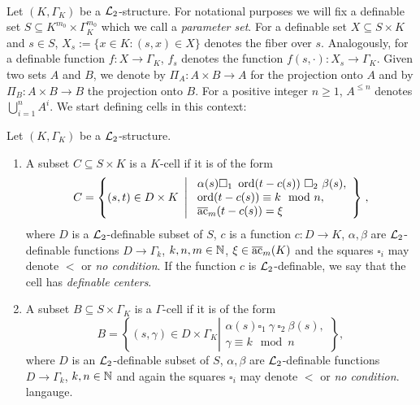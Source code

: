 \

Let $(K,\Gamma_K)$ be a ${\mathcal L}_2$-structure. For notational purposes we will fix a definable set $S \subseteq K^{m_0} \times \Gamma_K^{m_0}$ which we call a \emph{parameter set}. For a definable set $X\subseteq S\times K$ and $s\in S$, $X_s:=\{x\in K: (s,x)\in X\}$ denotes the fiber over $s$. Analogously, for a definable function $f:X\rightarrow \Gamma_K$, $f_s$ denotes the function $f(s,\cdot):X_s\rightarrow \Gamma_K$. Given two sets $A$ and $B$, we denote by $\Pi_{A}:A\times B\to A$ for the projection onto $A$ and by $\Pi_B:A\times B\to B$ the projection onto $B$. For a positive integer $n\geq 1$, $A^{\leq n}$ denotes $\bigcup_{i=1}^n A^i$. We start defining cells in this context: 


\begin{defn}[Cells] Let $(K,\Gamma_K)$ be a ${\mathcal L}_2$-structure.  
\begin{enumerate}
\item A subset $C\subseteq S\times K$ is a $K$-cell if it is of the form 
\[C = \left\{(s,t) \in D\times K \ \left| \ \begin{array}{l} \alpha(s) \square_1 \ \operatorname{ord}(t-c(s)) \ \square_2 \ \beta(s),\\ \operatorname{ord}(t-c(s)) \equiv k\mod n,\\ {\overline{\rm ac}}_{m}(t-c(s)) = \xi \end{array} \right\}\right.,\]
where $D$ is a ${\mathcal L}_2$-definable subset of $S$, $c$ is a function $c:D\to K$, $\alpha, \beta$ are $\mathcal{L}_2$-definable functions $D\to\Gamma_k$, $k, n, m \in {\mathbb N}$, $\xi \in {\overline{\rm ac}}_{m}(K)$ and the squares $\square_i$ may denote $<$ or \emph{no condition}. If the function $c$ is ${\mathcal L}_2$-definable, we say that the cell has \emph{definable centers}.  
\item A subset $B\subseteq S\times \Gamma_K$ is a $\Gamma$-cell if it is of the form
\[B= \left\{(s,\gamma)\in D\times \Gamma_K \left|\begin{array}{l} \alpha(s) \square_1 \ \gamma \ \square_2 \ \beta(s), \\
\gamma \equiv k\mod n \end{array}\right\}\right.,\]
where $D$ is an ${\mathcal L}_2$-definable subset of $S$, $\alpha, \beta$ are $\mathcal{L}_2$-definable functions $D\to\Gamma_k$, $k, n\in {\mathbb N}$ and again the squares $\square_i$ may denote $<$ or \emph{no condition}.  
 langauge. 
\end{enumerate}
\end{defn}

